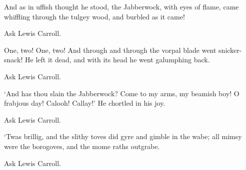 \documentclass[10pt]{examdesign}
\begin{document}
\begin{shortanswer}[title={Short Answer (10 pts each)},
                    rearrange=yes,resetcounter=no]
\begin{question}
  And as in uffish thought he stood, the Jabberwock, with eyes of flame,
  came whiffling through the tulgey wood, and burbled as it came!
  \begin{answer}
    Ask Lewis Carroll.
  \end{answer}
\end{question}

\begin{question}
  One, two! One, two! And through and through the vorpal blade went snicker-snack!
  He left it dead, and with its head he went galumphing back.
  \begin{answer}
    Ask Lewis Carroll.
  \end{answer}
\end{question}

\begin{question}
  `And has thou slain the Jabberwock? Come to my arms, my beamish boy!
  O frabjous day! Calooh! Callay!' He chortled in his joy.
  \begin{answer}
    Ask Lewis Carroll.
  \end{answer}
\end{question}

\begin{question}
  `Twas brillig, and the slithy toves did gyre and gimble in the wabe;
  all mimsy were the borogoves, and the mome raths outgrabe.
  \begin{answer}
    Ask Lewis Carroll.
  \end{answer}
\end{question}

\end{shortanswer}

 
\end{document}
